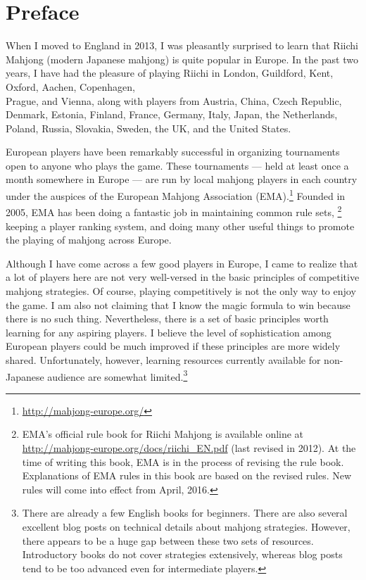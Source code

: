 \thispagestyle{empty}

\chapter{Preface}

When I moved to England in 2013, I was pleasantly surprised to learn that Riichi Mahjong (modern Japanese mahjong) is quite popular in Europe. In the past two years, I have had the pleasure of playing Riichi in London, Guildford, Kent, Oxford, Aachen, Copenhagen,\\ Prague, and Vienna, along with players from Austria, China, Czech Republic, Denmark, Estonia, Finland, France, Germany, Italy, Japan, the Netherlands, Poland, Russia, Slovakia, Sweden, the UK, and the United States. 

\bigskip
European players have been remarkably successful in organizing tournaments open to anyone who plays the game. These tournaments --- held at least once a month somewhere in Europe --- are run by local mahjong players in each country under the auspices of the European Mahjong Association (EMA).\footnote{\url{http://mahjong-europe.org/}} 
Founded in 2005, EMA has been doing a fantastic job in maintaining common rule sets,%
\footnote{EMA's official rule book for Riichi Mahjong is available online at \url{http://mahjong-europe.org/docs/riichi_EN.pdf} (last revised in 2012). At the time of writing this book, EMA is in the process of revising the rule book. 
Explanations of EMA rules in this book are based on the revised rules. New rules will come into effect from April, 2016.
}
keeping a player ranking system, and doing many other useful things to promote the playing of mahjong across Europe. 

\bigskip
Although I have come across a few good players in Europe, I came to realize that a lot of players here are not very well-versed in the basic principles of competitive mahjong strategies. Of course, playing competitively is not the only way to enjoy the game.
I am also not claiming that I know the magic formula to win because there is no such thing. Nevertheless, there is a set of basic principles worth learning for any aspiring players. I believe the level of sophistication among European players could be much improved if these principles are more widely shared. Unfortunately, however, learning resources currently available for non-Japanese audience are somewhat limited.\footnote{There are already a few English books for beginners. There are also several excellent blog posts on technical details about mahjong strategies. However, there appears to be a huge gap between these two sets of resources. Introductory books do not cover strategies extensively, whereas blog posts tend to be too advanced even for intermediate players.}

